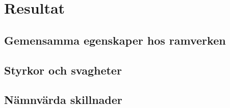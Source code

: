 
\newpage

\section{Resultat}

\subsection{Gemensamma egenskaper hos ramverken}

\subsection{Styrkor och svagheter}

\subsection{Nämnvärda skillnader}
